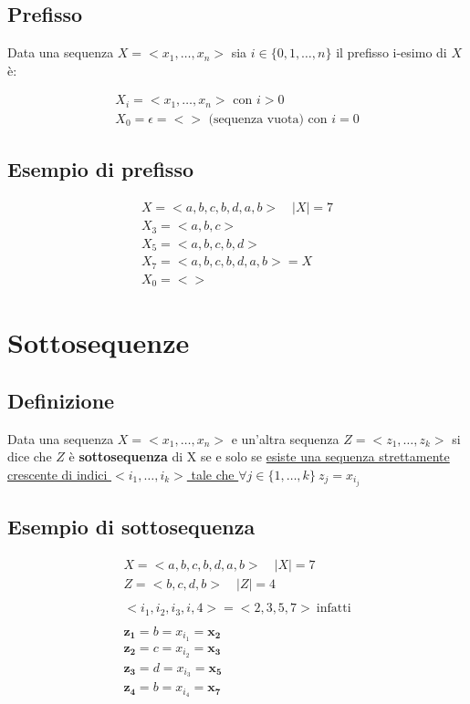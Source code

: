     \subsection{Prefisso}
    Data una sequenza $X = <x_1, \dots, x_n>$ sia $i \in \{0,1,\dots,n\}$ il prefisso i-esimo di $X$ è:
    {
        \Large
    
        \begin{gather*}
            X_i = <x_1, \dots, x_n> \text{ con } i>0 \\
            X_0 = \epsilon = <> \text{ (sequenza vuota) con }i=0
        \end{gather*}
    }

    \subsection{Esempio di prefisso}
    {
        \Large

        \begin{gather*}
            X = <a,b,c,b,d,a,b> \quad |X| = 7 \\
            X_3 = <a,b,c> \\
            X_5 = <a,b,c,b,d> \\
            X_7 = <a,b,c,b,d,a,b> = X \\
            X_0 = <>
        \end{gather*}
    }
    

\section{Sottosequenze}
    \subsection{Definizione}
    Data una sequenza $X=<x_1, \dots, x_n>$ e un'altra sequenza $Z=<z_1, \dots, z_k>$ si dice che $Z$ è \textbf{sottosequenza} di X se e solo se \uline{esiste una sequenza strettamente crescente di indici $<i_1, \dots, i_k>$ tale che $\forall j \in \{1, \dots, k\}\ z_j = x_{i_{j}}$} 

    \subsection{Esempio di sottosequenza}
    {
        \Large

        \begin{gather*}
            X = <a, b, c, b, d, a, b> \quad |X|=7 \\
            Z = <b, c, d, b> \quad |Z| = 4 \\ 
            \\
            <i_1, i_2, i_3, i,4> = <2, 3, 5, 7> \ \text{infatti} \\ 
            \\
            \mathbf{z_1} = b = x_{i_{1}} = \mathbf{x_2} \\
            \mathbf{z_2} = c = x_{i_2} = \mathbf{x_3} \\
            \mathbf{z_3} = d = x_{i_3} = \mathbf{x_5} \\
            \mathbf{z_4} = b = x_{i_4} = \mathbf{x_7}
        \end{gather*}
    }

